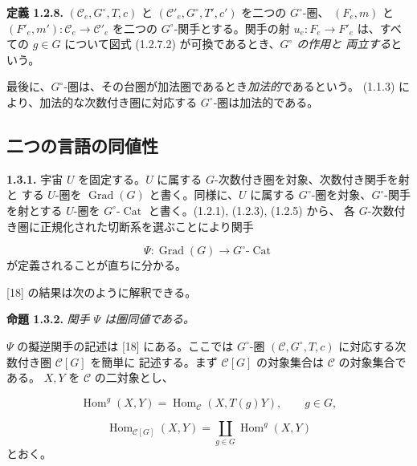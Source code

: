 \clearpage
{}%
\noindent\textbf{定義 1.2.8.}\quad
$(\mathcal C_e,G^\circ,T,c)$ と
$(\mathcal C'_e,G^\circ,T',c')$ を二つの $G^\circ$-圏、
$(F_e,m)$ と $(F'_e,m')\colon\mathcal C_e\to\mathcal C'_e$ を二つの
$G^\circ$-関手とする。関手の射 $u_e\colon F_e\to F'_e$ は、すべての
$g\in G$ について図式 (1.2.7.2) が可換であるとき、\emph{$G^\circ$ の作用と
両立する}という。

最後に、$G^\circ$-圏は、その台圏が加法圏であるとき\emph{加法的}であるという。
(1.1.3) により、加法的な次数付き圏に対応する $G^\circ$-圏は加法的である。

\subsection{二つの言語の同値性}

\noindent\textbf{1.3.1.}\quad
宇宙 $U$ を固定する。$U$ に属する $G$-次数付き圏を対象、次数付き関手を射と
する $U$-圏を $\operatorname{Grad}(G)$ と書く。同様に、$U$ に属する
$G^\circ$-圏を対象、$G^\circ$-関手を射とする $U$-圏を
$G^\circ\text{-}\operatorname{Cat}$ と書く。(1.2.1), (1.2.3), (1.2.5) から、
各 $G$-次数付き圏に正規化された切断系を選ぶことにより関手

\begin{equation}
  \Psi\colon \operatorname{Grad}(G)
  \longrightarrow G^\circ\text{-}\operatorname{Cat}
  \tag{1.3.1.1}
\end{equation}
が定義されることが直ちに分かる。

[18] の結果は次のように解釈できる。

\noindent\textbf{命題 1.3.2.}\quad
\emph{関手 $\Psi$ は圏同値である。}

$\Psi$ の擬逆関手の記述は [18] にある。ここでは $G^\circ$-圏
$(\mathcal C,G^\circ,T,c)$ に対応する次数付き圏 $\mathcal C[G]$ を簡単に
記述する。まず $\mathcal C[G]$ の対象集合は $\mathcal C$ の対象集合である。
$X,Y$ を $\mathcal C$ の二対象とし、

\begin{equation}
  \operatorname{Hom}^{g}(X,Y)
  =\operatorname{Hom}_{\mathcal C}(X,T(g)Y),
  \qquad g\in G,
  \tag{1.3.2.1}
\end{equation}

\begin{equation}
  \operatorname{Hom}_{\mathcal C[G]}(X,Y)
  =\coprod_{g\in G}\operatorname{Hom}^{g}(X,Y)
  \tag{1.3.2.2}
\end{equation}
とおく。

